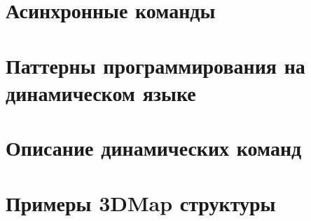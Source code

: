 \documentclass[14pt]{extbook}
\begin{document}
    \chapter{Асинхронные команды}
    

	\chapter{Паттерны программирования на динамическом языке}
    
    
    
    \appendix
    \chapter{Описание динамических команд}\label{sec:dlib_doc}
    \setcounter{secnumdepth}{0}
    

    \chapter{Примеры 3DMap структуры}\label{apx:3dmap}


    \clearpage
    \printglossaries 
\end{document}
